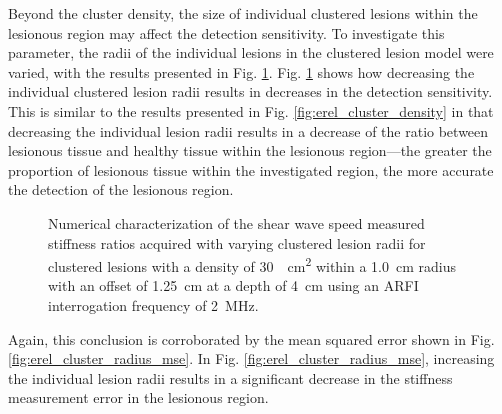 			Beyond the cluster density, the size of individual clustered lesions within the lesionous region may affect the detection sensitivity. To investigate this parameter, the radii of the individual lesions in the clustered lesion model were varied, with the results presented in Fig. \ref{fig:erel_cluster_radius}. Fig. \ref{fig:erel_cluster_radius} shows how decreasing the individual clustered lesion radii results in decreases in the detection sensitivity. This is similar to the results presented in Fig. \ref{fig:erel_cluster_density} in that decreasing the individual lesion radii results in a decrease of the ratio between lesionous tissue and healthy tissue within the lesionous region---the greater the proportion of lesionous tissue within the investigated region, the more accurate the detection of the lesionous region.

			\begin{figure}[!htb]
				\centering
				\caption[Numerical characterization of shear wave speed measured stiffness ratio with clustered lesions]{Numerical characterization of the shear wave speed measured stiffness ratios acquired with varying clustered lesion radii for clustered lesions with a density of \SI{30}{\per\cm\squared} within a \SI{1.0}{cm} radius with an offset of \SI{1.25}{\cm} at a depth of \SI{4}{\cm} using an ARFI interrogation frequency of \SI{2}{\MHz}.}
				\label{fig:erel_cluster_radius}
			\end{figure}

			Again, this conclusion is corroborated by the mean squared error shown in Fig. \ref{fig:erel_cluster_radius_mse}. In Fig. \ref{fig:erel_cluster_radius_mse}, increasing the individual lesion radii results in a significant decrease in the stiffness measurement error in the lesionous region.

